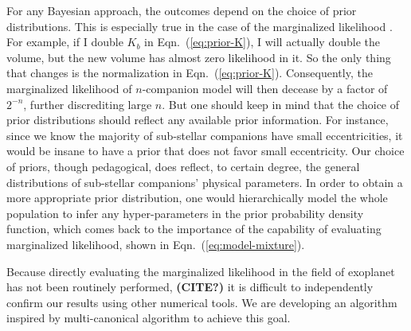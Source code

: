 \documentclass[letterpaper, preprint]{aastex}
\newcommand{\qer}[1]{{\bf{\color{red}#1}}}
\begin{document}
For any Bayesian approach, the outcomes depend on the choice of prior distributions. This is especially true in the case of the marginalized likelihood \citep{jaynes03a, cameron13a}. For example, if I double $K_b$ in Eqn.~(\ref{eq:prior-K}), I will actually double the volume, but the new volume has almost zero likelihood in it. So the only thing that changes is the normalization in Eqn.~(\ref{eq:prior-K}). Consequently, the marginalized likelihood of $n$-companion model will then decease by a factor of $2^{-n}$, further discrediting large $n$. But one should keep in mind that the choice of prior distributions should reflect any available prior information. For instance, since we know the majority of sub-stellar companions have small eccentricities, it would be insane to have a prior that does not favor small eccentricity. Our choice of priors, though pedagogical, does reflect, to certain degree, the general distributions of sub-stellar companions' physical parameters. In order to obtain a more appropriate prior distribution, one would hierarchically model the whole population to infer any hyper-parameters in the prior probability density function, which comes back to the importance of the capability of evaluating marginalized likelihood, shown in Eqn.~(\ref{eq:model-mixture}).

Because directly evaluating the marginalized likelihood in the field of exoplanet has not been routinely performed, \qer{(CITE?)} it is difficult to independently confirm our results using other numerical tools. We are developing an algorithm inspired by multi-canonical algorithm to achieve this goal.
\end{document}
